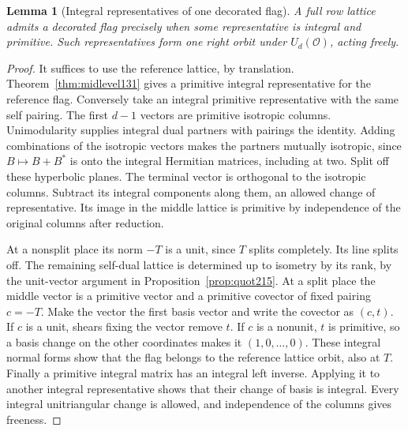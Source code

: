 \documentclass[a4paper,11pt]{article}
\newtheorem{lemma}[proposition]{Lemma}
\theoremstyle{definition}
\theoremstyle{remark}
\numberwithin{equation}{section}
\begin{document}
\begin{lemma}[Integral representatives of one decorated flag]\label{lem:flag215}
A full row lattice admits a decorated flag precisely when some
representative is integral and primitive. Such representatives
form one right orbit under \(U_d(\mathcal O)\), acting freely.
\end{lemma}
\begin{proof}
It suffices to use the reference lattice, by translation.
Theorem~\ref{thm:midlevel131} gives a primitive integral
representative for the reference flag. Conversely take an
integral primitive representative with the same self pairing.
The first \(d-1\) vectors are primitive isotropic columns.
Unimodularity supplies integral dual partners with pairings the
identity. Adding combinations of the isotropic vectors makes the
partners mutually isotropic, since \(B\mapsto B+B^*\) is onto
the integral Hermitian matrices, including at two. Split off
these hyperbolic planes. The terminal vector is orthogonal to
the isotropic columns. Subtract its integral components along
them, an allowed change of representative. Its image in the
middle lattice is primitive by independence of the original
columns after reduction.

At a nonsplit place its norm \(-T\) is a unit, since \(T\)
splits completely. Its line splits off. The remaining self-dual
lattice is determined up to isometry by its rank, by the
unit-vector argument in Proposition~\ref{prop:quot215}. At a
split place the middle vector is a primitive vector and a
primitive covector of fixed pairing \(c=-T\). Make the vector
the first basis vector and write the covector as \((c,t)\).
If \(c\) is a unit, shears fixing the vector remove \(t\).
If \(c\) is a nonunit, \(t\) is primitive, so a basis change
on the other coordinates makes it \((1,0,\ldots,0)\).
These integral normal forms show that the flag belongs to the
reference lattice orbit, also at \(T\). Finally a primitive
integral matrix has an integral left inverse. Applying it to
another integral representative shows that their change of basis
is integral. Every integral unitriangular change is allowed,
and independence of the columns gives freeness.
\end{proof}
\end{document}
